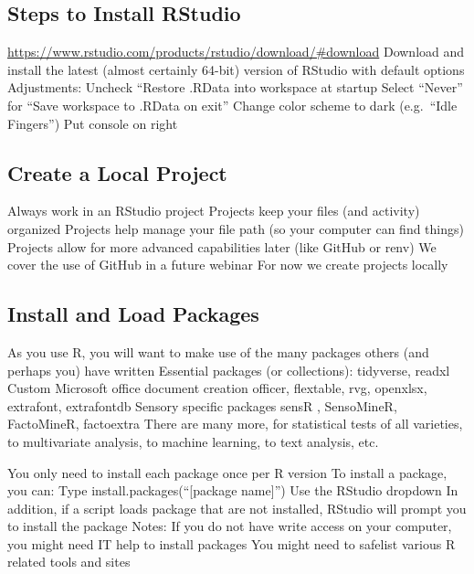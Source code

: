 \documentclass[
]{book}
\begin{document}
\hypertarget{steps-to-install-rstudio}{%
\subsection{Steps to Install RStudio}\label{steps-to-install-rstudio}}

\url{https://www.rstudio.com/products/rstudio/download/\#download}
Download and install the latest (almost certainly 64-bit) version of RStudio with default options
Adjustments:
Uncheck ``Restore .RData into workspace at startup
Select ``Never'' for ``Save workspace to .RData on exit''
Change color scheme to dark (e.g.~``Idle Fingers'')
Put console on right

\hypertarget{create-a-local-project}{%
\subsection{Create a Local Project}\label{create-a-local-project}}

Always work in an RStudio project
Projects keep your files (and activity) organized
Projects help manage your file path (so your computer can find things)
Projects allow for more advanced capabilities later (like GitHub or renv)
We cover the use of GitHub in a future webinar
For now we create projects locally

\hypertarget{install-and-load-packages}{%
\subsection{Install and Load Packages}\label{install-and-load-packages}}

As you use R, you will want to make use of the many packages others (and perhaps you) have written
Essential packages (or collections):
tidyverse, readxl
Custom Microsoft office document creation
officer, flextable, rvg, openxlsx, extrafont, extrafontdb
Sensory specific packages
sensR , SensoMineR, FactoMineR, factoextra
There are many more, for statistical tests of all varieties, to multivariate analysis, to machine learning, to text analysis, etc.

You only need to install each package once per R version
To install a package, you can:
Type install.packages(``{[}package name{]}'')
Use the RStudio dropdown
In addition, if a script loads package that are not installed, RStudio will prompt you to install the package
Notes:
If you do not have write access on your computer, you might need IT help to install packages
You might need to safelist various R related tools and sites
\end{document}
